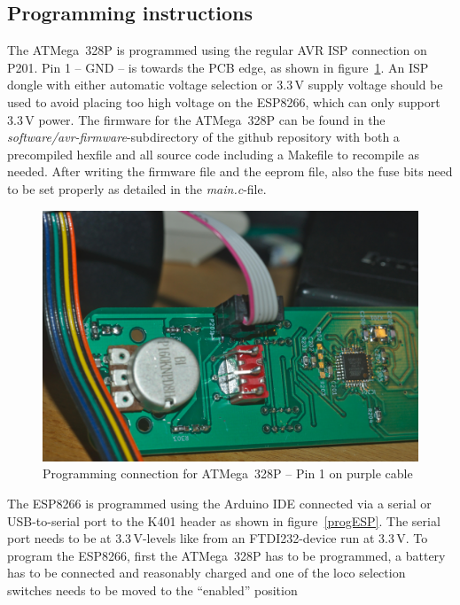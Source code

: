 \documentclass[11pt,a4paper]{scrartcl}
\begin{document}
\subsection{Programming instructions}

The ATMega~328P is programmed using the regular AVR ISP connection on P201. Pin 1 -- GND -- is towards the PCB edge, as shown in figure~\ref{progAVR}. An ISP dongle with either automatic voltage selection or 3.3\,V supply voltage should be used to avoid placing too high voltage on the ESP8266, which can only support 3.3\,V power. The firmware for the ATMega~328P can be found in the \textit{software/avr-firmware}-subdirectory of the github repository with both a precompiled hexfile and all source code including a Makefile to recompile as needed. After writing the firmware file and the eeprom file, also the fuse bits need to be set properly as detailed in the \textit{main.c}-file.

\begin{figure}[tbhp]
  \centering
  \includegraphics[width=0.8 \textwidth]{images/_DSC0146}
  \caption{Programming connection for ATMega~328P -- Pin 1 on purple cable}
  \label{progAVR}
\end{figure}

The ESP8266 is programmed using the Arduino IDE connected via a serial or USB-to-serial port to the K401 header as shown in figure~\ref{progESP}. The serial port needs to be at 3.3\,V-levels like from an FTDI232-device run at 3.3\,V. To program the ESP8266, first the ATMega~328P has to be programmed, a battery has to be connected and reasonably charged and one of the loco selection switches needs to be moved to the ``enabled'' position
\end{document}
